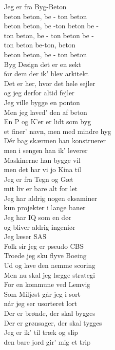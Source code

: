 Jeg er fra Byg-Beton\\
beton beton, be - ton beton\\
beton beton, be -ton beton be -\\
ton beton, be - ton beton be -\\
ton beton be-ton, beton\\
beton beton, be - ton beton\\

Byg Design det er en sekt\\
for dem der ik’ blev arkitekt\\
Det er her, hvor det hele sejler\\
og jeg derfor altid fejler\\
Jeg ville bygge en ponton\\
Men jeg laved’ den af beton\\

En P og K’er er lidt som byg\\
et finer’ navn, men med mindre hyg\\
Dér bag skærmen han konstruerer\\
men i sengen han ik’ leverer\\
Maskinerne han bygge vil\\
men det har vi jo Kina til\\

Jeg er fra Tegn og Gæt\\
mit liv er bare alt for let\\
Jeg har aldrig nogen eksaminer\\
kun projekter i lange baner\\
Jeg har IQ som en dør\\
og bliver aldrig ingeniør\\

Jeg læser SAS\\
Folk sir jeg er pseudo CBS\\
Troede jeg sku flyve Boeing\\
Ud og lave den nemme scoring\\
Men nu skal jeg lægge strategi\\
For en kommune ved Lemvig\\

Som Miljøst går jeg i sort\\
når jeg ser usorteret lort\\
Der er brønde, der skal bygges\\
Der er grønsager, der skal tygges\\
Jeg er ik’ til træk og slip\\
den bare jord gir’ mig et trip\\

